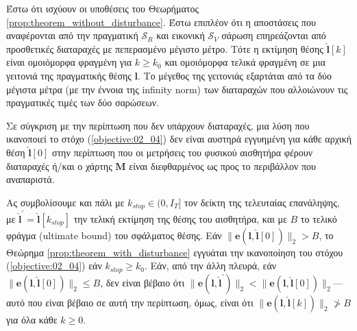 \begin{bw_box}
\begin{theorem}
  \label{prop:theorem_with_disturbance}
  Έστω ότι ισχύουν οι υποθέσεις του Θεωρήματος
  \ref{prop:theorem_without_disturbance}. Έστω επιπλέον ότι η αποστάσεις που
  αναφέρονται από την πραγματική $\mathcal{S}_R$ και εικονική $\mathcal{S}_V$
  σάρωση επηρεάζονται από προσθετικές διαταραχές με πεπερασμένο μέγιστο μέτρο.
  Τότε η εκτίμηση θέσης $\hat{\bm{l}}[k]$ είναι ομοιόμορφα φραγμένη για $k \geq
  k_0$ και ομοιόμορφα τελικά φραγμένη σε μια γειτονιά της πραγματικής θέσης
  $\bm{l}$. Το μέγεθος της γειτονιάς εξαρτάται από τα δύο μέγιστα μέτρα
  (με την έννοια της infinity norm) των διαταραχών που αλλοιώνουν τις
  πραγματικές τιμές των δύο σαρώσεων.
\end{theorem}
\end{bw_box}

\begin{corollary}
  Σε σύγκριση με την περίπτωση που δεν υπάρχουν διαταραχές, μια λύση που
  ικανοποιεί το στόχο (\ref{objective:02_04}) δεν είναι αυστηρά εγγυημένη για
  κάθε αρχική θέση $\hat{\bm{l}}[0]$ στην περίπτωση που οι μετρήσεις του φυσικού
  αισθητήρα φέρουν διαταραχές ή/και ο χάρτης $\bm{M}$ είναι διεφθαρμένος ως προς
  το περιβάλλον που αναπαριστά.
\end{corollary}

Ας συμβολίσουμε και πάλι με $k_{stop} \in (0, I_T]$ τον δείκτη της τελευταίας
επανάληψης, με $\hat{\bm{l}}^{\prime} = \hat{\bm{l}}[k_{stop}]$ την τελική
εκτίμηση της θέσης του αισθητήρα, και με $B$ το τελικό φράγμα (ultimate bound)
του σφάλματος θέσης. Εάν $\|\bm{e}(\bm{l}, \hat{\bm{l}}[0])\|_2 > B$, το
Θεώρημα \ref{prop:theorem_with_disturbance} εγγυάται την ικανοποίηση του στόχου
(\ref{objective:02_04}) εάν $k_{stop} \geq k_0$. Εάν, από την άλλη πλευρά, εάν
$\|\bm{e}(\bm{l}, \hat{\bm{l}}[0])\|_2 \leq B$, δεν είναι βέβαιο ότι
$\|\bm{e}(\bm{l}, \hat{\bm{l}}^{\prime})\|_2 < \|\bm{e}(\bm{l},
\hat{\bm{l}}[0])\|_2$---αυτό που είναι βέβαιο σε αυτή την περίπτωση, όμως,
είναι ότι $\|\bm{e}(\bm{l}, \hat{\bm{l}}[k])\|_2 \ngtr B$ για όλα κάθε $k \geq
0$.
